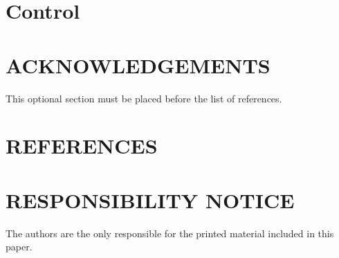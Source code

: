 \documentclass[10pt,fleqn,a4paper,twoside]{article}
\begin{document}
\section{Control}

\section{ACKNOWLEDGEMENTS}

This optional section must be placed before the list of references.

\section{REFERENCES} 


\renewcommand{\refname}{}


\section{RESPONSIBILITY NOTICE}

The authors are the only responsible for the printed material included in this paper.
\end{document}
